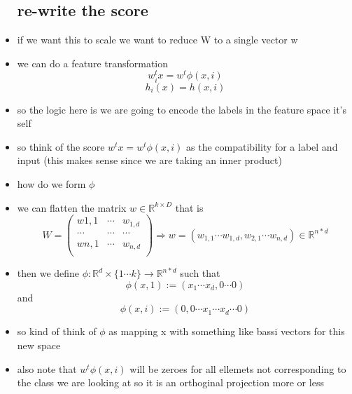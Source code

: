 \documentclass{article}
\begin{document}
\begin{itemize}
\subsection*{re-write the score }
\item if we want this to scale we want to reduce W to a single vector w 
\item we can do a feature transformation $$w_{i}^{t}x=w^{t}\phi(x,i)$$ $$h_i(x)=h(x,i)$$
\item so the logic here is we are going to encode the labels in the feature space it's self 
\item so think of the score $w^tx=w^{t}\phi(x,i)$ as the compatibility for a label and input (this makes sense since we are taking an inner product)
\item how do we form $\phi$
\item we can flatten the matrix $w\in \mathbb{R}^{k\times D}$ that is $$W=\begin{pmatrix}
    w{1,1}&\cdots& w_{1,d}\\
    \cdots &\cdots &\cdots \\
    w{n,1}&\cdots& w_{n,d}\\
\end{pmatrix}\Rightarrow w=(w_{1,1}\cdots w_{1,d}, w_{2,1}\cdots w_{n,d})\in \mathbb{R}^{n*d}$$
\item then we define $\phi:\mathbb{R}^{d}\times \{1\cdots k\}\rightarrow \mathbb{R}^{n*d}$
such that $$\phi(x,1):=(x_1\cdots x_d,0 \cdots 0)$$ and $$\phi({x,i}):=(0,0\cdots x_{1}\cdots x_{d}\cdots 0 )$$
\item so kind of think of $\phi$ as mapping x with something like bassi vectors for this new space 
\item also note that $w^{t}\phi(x,i)$ will be zeroes for all ellemets not corresponding to the class we are looking at so it is an orthoginal projection more or less

\end{itemize}
\end{document}
